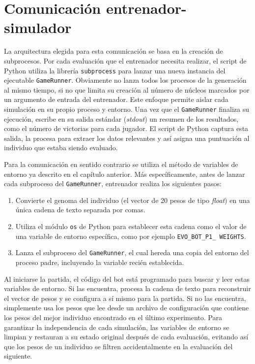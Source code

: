 \section{Comunicación entrenador-simulador} \label{sec:comunicacion_entrenador_simulador}

La arquitectura elegida para esta comunicación se basa en la creación de subprocesos. Por cada evaluación que el entrenador necesita realizar, el script de Python utiliza la librería \texttt{subprocess} para lanzar una nueva instancia del ejecutable \texttt{GameRunner}. Obviamente no lanza todos los procesos de la generación al mismo tiempo, si no que limita su creación al número de núcleos marcados por un argumento de entrada del entrenador. Este enfoque permite aislar cada simulación en su propio proceso y entorno. Una vez que el \texttt{GameRunner} finaliza su ejecución, escribe en su salida estándar (\textit{stdout}) un resumen de los resultados, como el número de victorias para cada jugador. El script de Python captura esta salida, la procesa para extraer los datos relevantes y así asigna una puntuación al individuo que estaba siendo evaluado.

Para la comunicación en sentido contrario se utiliza el método de variables de entorno ya descrito en el capítulo anterior. Más específicamente, antes de lanzar cada subproceso del \texttt{GameRunner}, entrenador realiza los siguientes pasos:
\begin{enumerate}
	\item Convierte el genoma del individuo (el vector de 20 pesos de tipo \textit{float}) en una única cadena de texto separada por comas.
	\item Utiliza el módulo \texttt{os} de Python para establecer esta cadena como el valor de una variable de entorno específica, como por ejemplo \texttt{EVO\_BOT\_P1\_ WEIGHTS}.
	\item Lanza el subproceso del \texttt{GameRunner}, el cual hereda una copia del entorno del proceso padre, incluyendo la variable recién establecida.
\end{enumerate}

Al iniciarse la partida, el código del bot está programado para buscar y leer estas variables de entorno. Si las encuentra, procesa la cadena de texto para reconstruir el vector de pesos y se configura a sí mismo para la partida. Si no las encuentra, simplemente usa los pesos que lee desde un archivo de configuración que contiene los pesos del mejor individuo encontrado en el último experimento. Para garantizar la independencia de cada simulación, las variables de entorno se limpian y restauran a su estado original después de cada evaluación, evitando así que los pesos de un individuo se filtren accidentalmente en la evaluación del siguiente.

